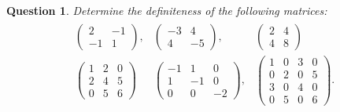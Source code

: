 \documentclass[12pt]{article}
\newtheorem{ques}[theorem]{Question}
\begin{document}
\newpage
\begin{ques}
Determine the definiteness of the following matrices:
\begin{align*}
    \begin{array}{ccc}
        \begin{pmatrix}
         2 &-1\\ -1 & 1
        \end{pmatrix}, & \begin{pmatrix}
         -3 & 4\\ 4 &-5
        \end{pmatrix}, &
        \begin{pmatrix}
         2 &4\\ 4 &8
        \end{pmatrix}
         \\ \begin{pmatrix}
         1&2 &0\\ 2& 4 & 5\\
         0 & 5&6
        \end{pmatrix}&
        \begin{pmatrix}
         -1& 1& 0\\ 1&-1 &0 \\ 0&0&-2
        \end{pmatrix}, & \begin{pmatrix}
         1&0&3&0\\ 0&2&0&5\\ 3& 0& 4&0\\ 0&5&0&6
        \end{pmatrix}.
    \end{array}
\end{align*}
\end{ques}
\end{document}
